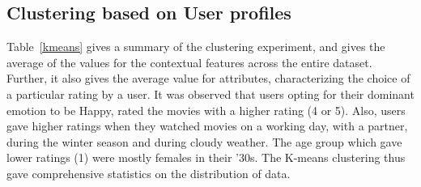 \documentclass{article}
\begin{document}

\subsection{Clustering based on User profiles}
 Table~\ref{kmeans} gives a summary of the clustering experiment, and gives the average of the values for the contextual features across the entire dataset. Further, it also gives the average value for attributes, characterizing the choice of a particular rating by a user. It was observed that users opting for their dominant emotion to be Happy, rated the movies with a higher rating (4 or 5). Also, users gave higher ratings when they watched movies on a working day, with a partner, during the winter season and during cloudy weather. The age group which gave lower ratings (1) were mostly females in their '30s. The K-means clustering thus gave comprehensive statistics on the distribution of data.
\end{document}
